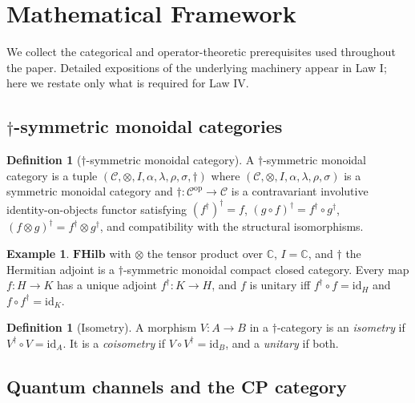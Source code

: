 \documentclass[12pt]{article}
\theoremstyle{definition}
\newtheorem{definition}[theorem]{Definition}
\newtheorem{example}[theorem]{Example}
\theoremstyle{remark}
\newcommand{\FHilb}{\mathbf{FHilb}}
\newcommand{\id}{\mathrm{id}}
\begin{document}
\section{Mathematical Framework}
\label{sec:framework}

We collect the categorical and operator-theoretic prerequisites used throughout the paper. Detailed expositions of the underlying machinery appear in Law I; here we restate only what is required for Law IV.

\subsection[dagger-symmetric monoidal categories]{$\dagger$-symmetric monoidal categories}

\begin{definition}[$\dagger$-symmetric monoidal category]
\label{def:dagger-smc}
A $\dagger$-symmetric monoidal category is a tuple $(\mathcal{C},\otimes, I, \alpha,\lambda,\rho,\sigma,\dagger)$ where $(\mathcal{C},\otimes,I,\alpha,\lambda,\rho,\sigma)$ is a symmetric monoidal category and $\dagger\colon \mathcal{C}^{\mathrm{op}} \to \mathcal{C}$ is a contravariant involutive identity-on-objects functor satisfying $(f^\dagger)^\dagger = f$, $(g\circ f)^\dagger = f^\dagger \circ g^\dagger$, $(f\otimes g)^\dagger = f^\dagger \otimes g^\dagger$, and compatibility with the structural isomorphisms.
\end{definition}

\begin{example}
$\FHilb$ with $\otimes$ the tensor product over $\mathbb{C}$, $I = \mathbb{C}$, and $\dagger$ the Hermitian adjoint is a $\dagger$-symmetric monoidal compact closed category. Every map $f\colon H \to K$ has a unique adjoint $f^\dagger\colon K\to H$, and $f$ is unitary iff $f^\dagger \circ f = \id_H$ and $f\circ f^\dagger = \id_K$.
\end{example}

\begin{definition}[Isometry]
\label{def:isometry}
A morphism $V\colon A \to B$ in a $\dagger$-category is an \emph{isometry} if $V^\dagger \circ V = \id_A$. It is a \emph{coisometry} if $V\circ V^\dagger = \id_B$, and a \emph{unitary} if both.
\end{definition}

\subsection{Quantum channels and the CP category}
\end{document}
